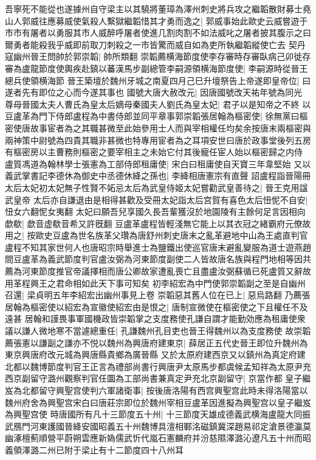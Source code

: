 吾寧死不能從也遂據州自守梁主以其驍將董璋為澤州刺史將兵攻之繼韜散財募士堯山人郭威往應募威使氣殺人繫獄繼韜惜其才勇而逸之|{
	郭威事始此歐史云威嘗遊于市市有屠者以勇服其市人威醉呼屠者使進几割肉割不如法威叱之屠者披其腹示之曰爾勇者能殺我乎威即前取刀刺殺之一市皆驚而威自如為吏所執繼韜縱使亡去}
契丹寇幽州晉王問帥於郭崇韜|{
	帥所類翻}
崇韜薦横海節度使李存審時存審臥病己卯徙存審為盧龍節度使輿疾赴鎮以蕃漢馬步副總管李嗣源領横海節度使|{
	李嗣源時從晉王總兵使領横海節}
晉王築壇於魏州牙城之南夏四月己巳升壇祭告上帝遂即皇帝位|{
	曰遂者先有即位之心而今遂其事也}
國號大唐大赦改元|{
	因唐國號改天祐年號為同光}
尊母晉國太夫人曹氏為皇太后嫡母秦國夫人劉氏為皇太妃|{
	君子以是知帝之不終}
以豆盧革為門下侍郎盧程為中書侍郎並同平章事郭崇韜張居翰為樞密使|{
	徐無黨曰樞密使唐故事宦者為之其職甚微至此始參用士人而與宰相權任均矣余按唐末兩樞密與兩神策中尉號為四貴其職非甚微也特專用宦者為之耳項安世曰唐於政事堂後列五房有樞密房以主曹務則樞密之要宰相主之未始它付其後寵任宦人始以樞密歸之内侍}
盧質馮道為翰林學士張憲為工部侍郎租庸使|{
	宋白曰租庸使自天寶三年韋堅始}
又以義武掌書記李德休為御史中丞德休絳之孫也|{
	李絳相唐憲宗有直聲}
詔盧程詣晉陽冊太后太妃初太妃無子性賢不妬忌太后為武皇侍姬太妃嘗勸武皇善待之|{
	晉王克用諡武皇帝}
太后亦自謙退由是相得甚歡及受冊太妃詣太后宫賀有喜色太后忸怩不自安|{
	忸女六翻怩女夷翻}
太妃曰願吾兒享國久長吾輩獲沒於地園陵有主餘何足言因相向歔欷|{
	歔音虚欷音希又許旣翻}
豆盧革盧程皆輕淺無它能上以其衣冠之緒霸府元僚故用之|{
	按歐史豆盧為世名族革父瓚為唐舒州刺史唐末之亂革避地中山為王處直判官盧程不知其家世何人也唐昭宗時舉進士為鹽鐵出使巡官唐末避亂變服為道士遊燕趙間豆盧革為義武節度判官盧汝弼為河東節度副使二人皆故唐名族與程門地相等因共薦為河東節度推官帝議擇相而唐公卿故家遭亂喪亡且盡盧汝弼蘇循已死盧質又辭故用革程興王之君命相如此天下事可知矣}
初李紹宏為中門使郭崇韜副之至是自幽州召還|{
	梁貞明五年李紹宏出幽州事見上卷}
崇韜惡其舊人位在已上|{
	惡烏路翻}
乃薦張居翰為樞密使以紹宏為宣徽使紹宏由是恨之|{
	唐制宣微使在樞密使之下且權任不及遠甚}
居翰和謹畏事軍國機政皆崇韜掌之支度務使孔謙自謂才能勤効應為租庸使衆議以謙人微地寒不當遽總重任|{
	孔謙魏州孔目吏也晉王得魏州以為支度務使}
故崇韜薦張憲以謙副之謙亦不悦以魏州為興唐府建東京|{
	薛居正五代史晉王即位升魏州為東京興唐府改元城為興唐縣貴鄉為廣晉縣}
又於太原府建西京又以鎮州為真定府建北都以魏博節度判官王正言為禮部尚書行興唐尹太原馬步都虞候孟知祥為太原尹充西京副留守潞州觀察判官任圜為工部尚書兼真定尹充北京副留守|{
	京當作都}
皇子繼岌為北都留守興聖宫使判六軍諸衛事|{
	按後唐洛陽有西宫興聖宫此時未得洛陽當以魏州府舍為興聖宫宋白曰唐莊宗即位於魏州宰相豆盧革因進擬為興聖宫以皇子繼岌為興聖宫使}
時唐國所有凡十三節度五十州|{
	十三節度天雄成德義武横海盧龍大同振武鴈門河東護國晉絳安國昭義五十州魏博具澶相鄆洺磁鎮冀深趙易祁定滄景德瀛莫幽涿檀薊順營平蔚朔雲應新媯儒武忻代嵐石憲麟府并汾慈隰澤潞沁遼凡五十州而昭義領澤潞二州已附于梁止有十二節度四十八州耳}
